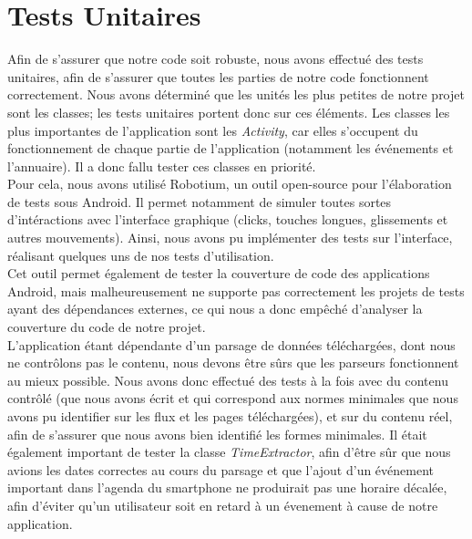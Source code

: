 \section{Tests Unitaires}
Afin de s'assurer que notre code soit robuste, nous avons effectué des tests unitaires, afin de s'assurer que toutes les parties de notre code fonctionnent correctement. Nous avons déterminé que les unités les plus petites de notre projet sont les classes; les tests unitaires portent donc sur ces éléments. Les classes les plus importantes de l’application sont les \emph{Activity}, car elles s’occupent du fonctionnement de chaque partie de l’application (notamment les événements et l'annuaire). Il a donc fallu tester ces classes en priorité.\\
Pour cela, nous avons utilisé Robotium, un outil open-source pour l'élaboration de tests sous Android. Il permet notamment de simuler toutes sortes d'intéractions avec l'interface graphique (clicks, touches longues, glissements et autres mouvements). Ainsi, nous avons pu implémenter des tests sur l'interface, réalisant quelques uns de nos tests d'utilisation.\\
Cet outil permet également de tester la couverture de code des applications Android, mais malheureusement ne supporte pas correctement les projets de tests ayant des dépendances externes, ce qui nous a donc empêché d'analyser la couverture du code de notre projet.\\

L'application étant dépendante d'un parsage de données téléchargées, dont nous ne contrôlons pas le contenu, nous devons être sûrs que les parseurs fonctionnent au mieux possible. Nous avons donc effectué des tests à la fois avec du contenu contrôlé (que nous avons écrit et qui correspond aux normes minimales que nous avons pu identifier sur les flux et les pages téléchargées), et sur du contenu réel, afin de s'assurer que nous avons bien identifié les formes minimales.
Il était également important de tester la classe \emph{TimeExtractor}, afin d'être sûr que nous avions les dates correctes au cours du parsage et que l'ajout d'un événement important dans l'agenda du smartphone ne produirait pas une horaire décalée, afin d'éviter qu'un utilisateur soit en retard à un évenement à cause de notre application.
